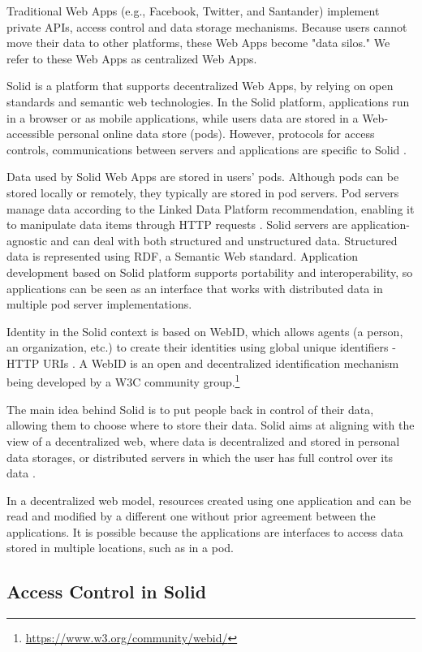 \documentclass[sigconf]{acmart}
\begin{document}
Traditional Web Apps (e.g., Facebook, Twitter, and Santander) implement private APIs, access control and data storage mechanisms. Because users cannot move their data to other platforms, these Web Apps become "data silos." We refer to these Web Apps as centralized Web Apps.

Solid is a platform that supports decentralized Web Apps, by relying on open standards and semantic web technologies. In the Solid platform, applications run in a browser or as mobile applications, while users data are stored in a Web-accessible personal online data store (pods). However, protocols for access controls, communications between servers and applications are specific to Solid \cite{Sambra}.

Data used by Solid Web Apps are stored in users' pods. Although pods can be stored locally or remotely, they typically are stored in pod servers. Pod servers manage data according to the Linked Data Platform recommendation, enabling it to manipulate data items through HTTP requests \cite{LDP}. Solid servers are application-agnostic and can deal with both structured and unstructured data. Structured data is represented using RDF, a Semantic Web standard. Application development based on Solid platform supports portability and interoperability, so applications can be seen as an interface that works with distributed data in multiple pod server implementations.

Identity in the Solid context is based on WebID, which allows agents (a person, an organization, etc.) to create their identities using global unique identifiers - HTTP URIs \cite{Sambra}. A WebID is an open and decentralized identification mechanism being developed by a W3C community group.\footnote{\url{https://www.w3.org/community/webid/}}

The main idea behind Solid is to put people back in control of their data, allowing them to choose where to store their data. Solid aims at aligning with the view of a decentralized web, where data is decentralized and stored in personal data storages, or distributed servers in which the user has full control over its data \cite{verborgh_iswc_2018}.

In a decentralized web model, resources created using one application and can be read and modified by a different one without prior agreement between the applications. It is possible because the applications are interfaces to access data stored in multiple locations, such as in a pod.

\subsection{Access Control in Solid}
\end{document}
